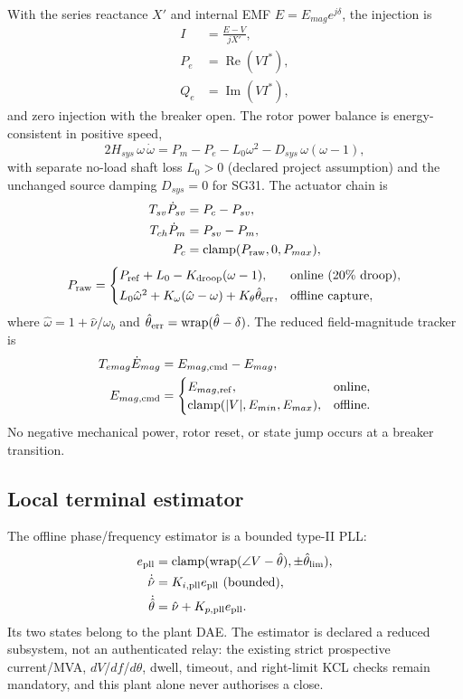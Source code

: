 With the series reactance $X'$ and internal EMF
$E=E_{mag}e^{j\delta}$, the injection is
\begin{align}
I&=\frac{E-V}{jX'},\\
P_e&=\operatorname{Re}(V I^*),\\
Q_e&=\operatorname{Im}(V I^*),
\end{align}
and zero injection with the breaker open.  The rotor power balance is
energy-consistent in positive speed,
\[
2H_{sys}\,\omega\,\dot\omega
   =P_m-P_e-L_0\omega^2-D_{sys}\,\omega(\omega-1),
\]
with separate no-load shaft loss $L_0>0$ (declared project assumption) and the
unchanged source damping $D_{sys}=0$ for SG31.  The actuator chain is
\begin{align}
T_{sv}\dot P_{sv}&=P_c-P_{sv},\\
T_{ch}\dot P_m&=P_{sv}-P_m,\\
P_c&=\operatorname{clamp}(P_{\rm raw},0,P_{max}),
\end{align}
\[
P_{\rm raw}=
\begin{cases}
P_{\rm ref}+L_0-K_{\rm droop}(\omega-1), & \text{online (20\% droop)},\\[2pt]
L_0\hat\omega^2+K_\omega(\hat\omega-\omega)+K_\theta\hat\theta_{\rm err}, & \text{offline capture},
\end{cases}
\]
where $\hat\omega=1+\hat\nu/\omega_b$ and
$\hat\theta_{\rm err}=\operatorname{wrap}(\hat\theta-\delta)$.  The reduced
field-magnitude tracker is
\begin{align}
T_{emag}\dot E_{mag}&=E_{mag,\rm cmd}-E_{mag},\\
E_{mag,\rm cmd}&=
\begin{cases}
E_{mag,\rm ref}, & \text{online},\\
\operatorname{clamp}(|V|,E_{min},E_{max}), & \text{offline}.
\end{cases}
\end{align}
No negative mechanical power, rotor reset, or state jump occurs at a breaker
transition.

\subsection{Local terminal estimator}

The offline phase/frequency estimator is a bounded type-II PLL:
\begin{align}
e_{\rm pll}&=\operatorname{clamp}(\operatorname{wrap}(\angle V-\hat\theta),\pm\hat\theta_{\rm lim}),\\
\dot{\hat\nu}&=K_{i,\rm pll}e_{\rm pll}\ \text{(bounded)},\\
\dot{\hat\theta}&=\hat\nu+K_{p,\rm pll}e_{\rm pll}.
\end{align}
Its two states belong to the plant DAE.  The estimator is declared a
reduced subsystem, not an authenticated relay: the existing strict
prospective current/MVA, $dV$/$df$/$d\theta$, dwell, timeout, and right-limit
KCL checks remain mandatory, and this plant alone never authorises a close.

